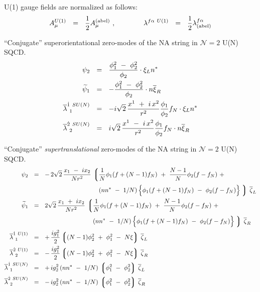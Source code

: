 \documentclass{article}
\newcommand{\wt}{\widetilde}
\newcommand{\ov}{\overline}
\newcommand{\lgr}{\left\lgroup}
\newcommand{\rgr}{\right\rgroup}
\begin{document}
	U(1) gauge fields are normalized as follows:
\begin{equation}
\label{abel_norm}
	A^{U(1)}_\mu ~~=~~ \frac 1 2 A^{\rm (abel)}_\mu ~, 
	\qquad\qquad   \lambda^{f\alpha\ U(1)} ~~=~~ \frac 1 2 \lambda^{f\alpha}_{\rm (abel)}
\end{equation}


\pagebreak

 ``Conjugate'' superorientational zero-modes of the NA string in ${\mathcal N}=2$ U(N) SQCD.
\begin{align}
\label{n2_sorient_conj}
%
\notag
{\psi}_{2} & ~~=~~ \frac{\phi_1^2 ~-~ \phi_2^2}{\phi_2} \cdot \xi_L n^*   \\
%
\notag
\wt{\psi}_{1}  & ~~=~~ - \frac{\phi_1^2 ~-~ \phi_2^2}{\phi_2} \cdot n \ov{\xi}_R  \\
%
\ov{\lambda}^{\dot{1}\ SU(N)}_{\ 1} & ~~=~~ - i \sqrt{2}\, \frac{ x^1 ~+~ i\, x^2 }{r^2} \frac{\phi_1}{\phi_2} f_N \cdot \xi_L n^* \\
%
\notag
\ov{\lambda}^{\dot{2}\ SU(N)}_{\ 2} & ~~=~~  i \sqrt{2}\, \frac{ x^1 ~-~ i\, x^2 }{r^2} \frac{\phi_1}{\phi_2} f_N \cdot n \ov{\xi}_R 
\end{align}

 ``Conjugate'' {\it supertranslational} zero-modes of the NA string in ${\mathcal N}=2$ U(N) SQCD.
\begin{align*}
%
\psi_{2}	& ~~=~~  -\,  2\sqrt{2}\, \frac{x_1 ~-~ i x_2}{N r^2} \,
		\lgr \frac{1}{N} \phi_1 ( f + (N-1) f_N ) ~+~ \frac{N-1}{N} \phi_2 ( f - f_N ) ~+~ \right.
		\\
%
			& \phantom{~~=~~  -\,  2\sqrt{2}\, \frac{x_1 ~-~ i x_2}{N r^2} \,\lgr \right.}
			\left( nn^* ~-~ 1/N \right )
			\Bigl\{ \phi_1 ( f + ( N-1 ) f_N ) ~-~ \phi_2 ( f - f_N) \Bigr\}
		\left. \rgr\, \ov{\zeta}_L
		\\
%
\wt{\psi}_{1} & ~~=~~    2\sqrt{2} \, \frac{x_1 ~+~ i x_2}{N r^2} \,
		\lgr \frac{1}{N} \phi_1 ( f + (N-1) f_N ) ~+~ \frac{N-1}{N} \phi_2 ( f - f_N ) ~+~ \right.
		\\
%
			& \phantom{~~=~~    2\sqrt{2} \, \frac{x_1 ~+~ i x_2}{N r^2} \,\lgr \right.}
			\left( nn^* ~-~ 1/N \right )
			\Bigl\{ \phi_1 ( f + ( N-1 ) f_N ) ~-~ \phi_2 ( f - f_N) \Bigr\}
		\left. \rgr\, \ov{\zeta}_R
		\\
%
\ov{\lambda}^{\dot{1}\ U(1)}_{\ 1} 	& ~~=~~ +\, \frac{i g_1^2}{2} \lgr (N-1)\phi_2^2  ~+~ \phi_1^2 ~-~ N\xi \rgr \, \ov{\zeta}_L 
		\\
%
\ov{\lambda}^{\dot{2}\ U(1)}_{\ 2} 	& ~~=~~ -\, \frac{i g_1^2}{2} \lgr (N-1)\phi_2^2  ~+~ \phi_1^2 ~-~ N\xi \rgr \, \ov{\zeta}_R 
		\\
%
\ov{\lambda}^{\dot{1}\ SU(N)}_{\ 1}	& ~~=~~ +\, {i g_2^2}\, ( nn^* ~-~ 1/N )\, \lgr \phi_1^2 ~-~ \phi_2^2 \rgr\, \ov{\zeta}_L
		\\
%
\ov{\lambda}^{\dot{2}\ SU(N)}_{\ 2}	& ~~=~~ -\, {i g_2^2}\, ( nn^* ~-~ 1/N )\, \lgr \phi_1^2 ~-~ \phi_2^2 \rgr\, \ov{\zeta}_R
\end{align*}
\end{document}
